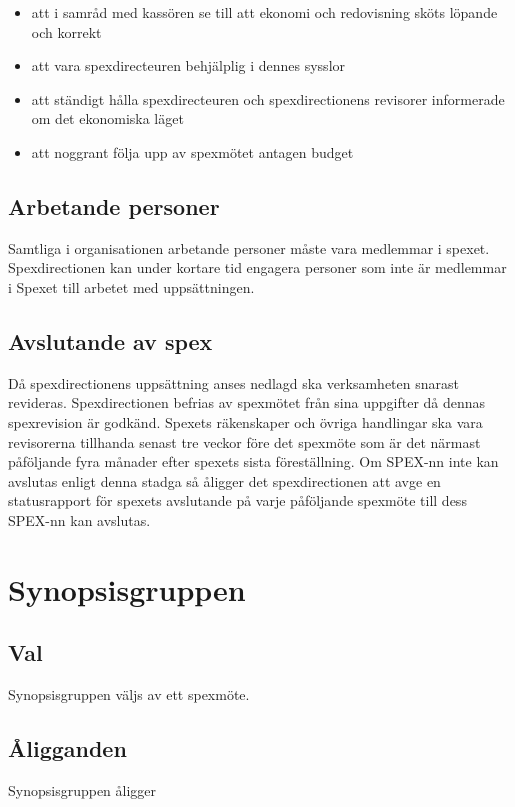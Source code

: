 \documentclass[a4paper]{article}
\begin{document}
\begin{itemize}
  \item att i samråd med kassören se till att ekonomi och redovisning sköts löpande och korrekt
  \item att vara spexdirecteuren behjälplig i dennes sysslor
  \item att ständigt hålla spexdirecteuren och spexdirectionens revisorer informerade om det ekonomiska läget
  \item att noggrant följa upp av spexmötet antagen budget
\end{itemize}

\subsection{Arbetande personer}
Samtliga i organisationen arbetande personer måste vara medlemmar i spexet. Spexdirectionen kan under kortare tid engagera personer som inte är medlemmar i Spexet till arbetet med uppsättningen.

\subsection{Avslutande av spex}
Då spexdirectionens uppsättning anses nedlagd ska verksamheten snarast revideras. Spexdirectionen befrias av spexmötet från sina uppgifter då dennas spexrevision är godkänd.\newline
\newline
Spexets räkenskaper och övriga handlingar ska vara revisorerna tillhanda senast tre veckor före det spexmöte som är det närmast påföljande fyra månader efter spexets sista föreställning.\newline
\newline
Om SPEX-nn inte kan avslutas enligt denna stadga så åligger det spexdirectionen att avge en statusrapport för spexets avslutande på varje påföljande spexmöte till dess SPEX-nn kan avslutas.

\section{Synopsisgruppen}
\label{section:synopsisgruppen}

\subsection{Val}
Synopsisgruppen väljs av ett spexmöte.

\subsection{Åligganden}
Synopsisgruppen åligger
\end{document}

